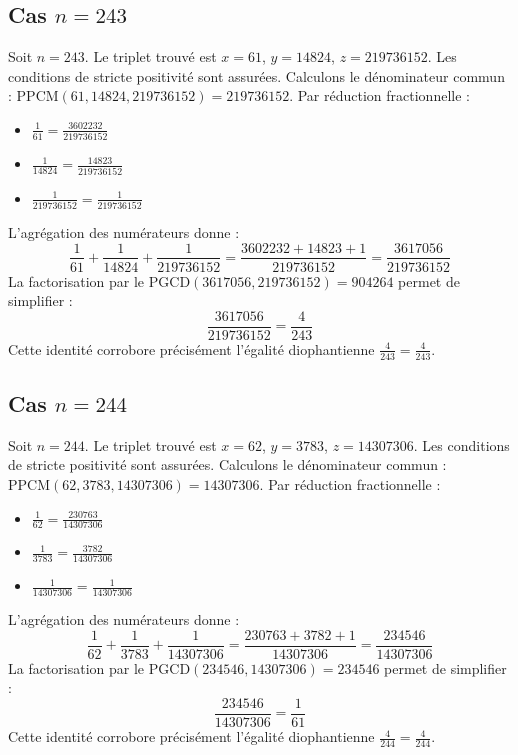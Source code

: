\documentclass[11pt,a4paper]{article}
\begin{document}
\subsection{Cas $n = 243$}
Soit $n = 243$. Le triplet trouvé est $x = 61$, $y = 14824$, $z = 219736152$.
Les conditions de stricte positivité sont assurées.
Calculons le dénominateur commun : $\text{PPCM}(61, 14824, 219736152) = 219736152$.
Par réduction fractionnelle :
\begin{itemize}
    \item $\frac{1}{61} = \frac{3602232}{219736152}$
    \item $\frac{1}{14824} = \frac{14823}{219736152}$
    \item $\frac{1}{219736152} = \frac{1}{219736152}$
\end{itemize}
L'agrégation des numérateurs donne :
$$ \frac{1}{61} + \frac{1}{14824} + \frac{1}{219736152} = \frac{3602232 + 14823 + 1}{219736152} = \frac{3617056}{219736152} $$
La factorisation par le $\text{PGCD}(3617056, 219736152) = 904264$ permet de simplifier :
$$ \frac{3617056}{219736152} = \frac{4}{243} $$
Cette identité corrobore précisément l'égalité diophantienne $\frac{4}{243} = \frac{4}{243}$.

\subsection{Cas $n = 244$}
Soit $n = 244$. Le triplet trouvé est $x = 62$, $y = 3783$, $z = 14307306$.
Les conditions de stricte positivité sont assurées.
Calculons le dénominateur commun : $\text{PPCM}(62, 3783, 14307306) = 14307306$.
Par réduction fractionnelle :
\begin{itemize}
    \item $\frac{1}{62} = \frac{230763}{14307306}$
    \item $\frac{1}{3783} = \frac{3782}{14307306}$
    \item $\frac{1}{14307306} = \frac{1}{14307306}$
\end{itemize}
L'agrégation des numérateurs donne :
$$ \frac{1}{62} + \frac{1}{3783} + \frac{1}{14307306} = \frac{230763 + 3782 + 1}{14307306} = \frac{234546}{14307306} $$
La factorisation par le $\text{PGCD}(234546, 14307306) = 234546$ permet de simplifier :
$$ \frac{234546}{14307306} = \frac{1}{61} $$
Cette identité corrobore précisément l'égalité diophantienne $\frac{4}{244} = \frac{4}{244}$.
\end{document}
